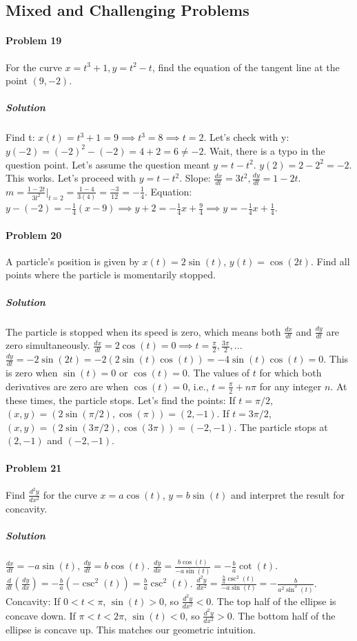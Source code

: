\documentclass{article}
\begin{document}
\subsection*{Mixed and Challenging Problems}

\paragraph{Problem 19}
For the curve $x=t^3+1, y=t^2-t$, find the equation of the tangent line at the point $(9,-2)$.

\subparagraph{Solution}
Find t: $x(t) = t^3+1 = 9 \implies t^3=8 \implies t=2$.
Let's check with y: $y(-2) = (-2)^2 - (-2) = 4+2=6 \neq -2$. Wait, there is a typo in the question point. Let's assume the question meant $y=t-t^2$.
$y(2)=2-2^2 = -2$. This works. Let's proceed with $y=t-t^2$.
Slope: $\frac{dx}{dt}=3t^2, \frac{dy}{dt}=1-2t$.
$m = \frac{1-2t}{3t^2}|_{t=2} = \frac{1-4}{3(4)} = \frac{-3}{12} = -\frac{1}{4}$.
Equation: $y - (-2) = -\frac{1}{4}(x-9) \implies y+2 = -\frac{1}{4}x+\frac{9}{4} \implies y = -\frac{1}{4}x + \frac{1}{4}$.

\paragraph{Problem 20}
A particle's position is given by $x(t) = 2\sin(t)$, $y(t) = \cos(2t)$. Find all points where the particle is momentarily stopped.

\subparagraph{Solution}
The particle is stopped when its speed is zero, which means both $\frac{dx}{dt}$ and $\frac{dy}{dt}$ are zero simultaneously.
$\frac{dx}{dt} = 2\cos(t) = 0 \implies t = \frac{\pi}{2}, \frac{3\pi}{2}, ...$
$\frac{dy}{dt} = -2\sin(2t) = -2(2\sin(t)\cos(t)) = -4\sin(t)\cos(t) = 0$.
This is zero when $\sin(t)=0$ or $\cos(t)=0$.
The values of $t$ for which both derivatives are zero are when $\cos(t)=0$, i.e., $t = \frac{\pi}{2} + n\pi$ for any integer $n$.
At these times, the particle stops. Let's find the points:
If $t=\pi/2$, $(x,y) = (2\sin(\pi/2), \cos(\pi)) = (2, -1)$.
If $t=3\pi/2$, $(x,y) = (2\sin(3\pi/2), \cos(3\pi)) = (-2, -1)$.
The particle stops at $(2, -1)$ and $(-2, -1)$.

\paragraph{Problem 21}
Find $\frac{d^2y}{dx^2}$ for the curve $x=a\cos(t)$, $y=b\sin(t)$ and interpret the result for concavity.

\subparagraph{Solution}
$\frac{dx}{dt} = -a\sin(t)$, $\frac{dy}{dt} = b\cos(t)$.
$\frac{dy}{dx} = \frac{b\cos(t)}{-a\sin(t)} = -\frac{b}{a}\cot(t)$.
$\frac{d}{dt}(\frac{dy}{dx}) = -\frac{b}{a}(-\csc^2(t)) = \frac{b}{a}\csc^2(t)$.
$\frac{d^2y}{dx^2} = \frac{\frac{b}{a}\csc^2(t)}{-a\sin(t)} = -\frac{b}{a^2\sin^3(t)}$.
Concavity:
If $0 < t < \pi$, $\sin(t) > 0$, so $\frac{d^2y}{dx^2} < 0$. The top half of the ellipse is concave down.
If $\pi < t < 2\pi$, $\sin(t) < 0$, so $\frac{d^2y}{dx^2} > 0$. The bottom half of the ellipse is concave up. This matches our geometric intuition.
\end{document}
